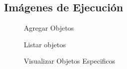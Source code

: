 \documentclass{article}
\begin{document}
  \subsection{Imágenes de Ejecución}
  \begin{figure}[H]
    \centering
    \caption{Agregar Objetos}
  \end{figure}
  \begin{figure}[H]
    \centering
    \caption{Listar objetos}
  \end{figure}
  \begin{figure}[H]
    \centering
    \caption{Visualizar Objetos Especificos}
  \end{figure}
\end{document}
